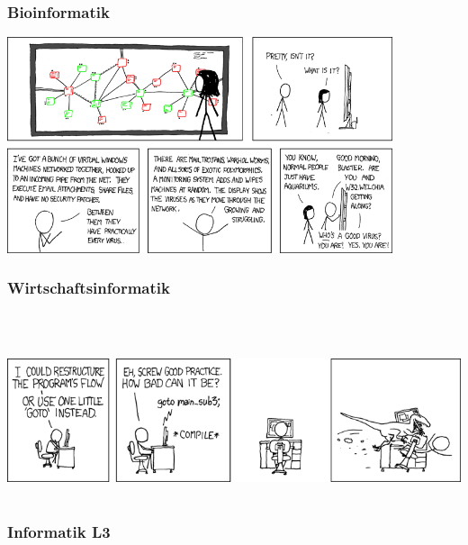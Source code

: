 \documentclass[12pt,a4paper]{scrartcl}
\begin{document}
	\subsubsection{Bioinformatik}
    

    \begin{center}
        \includegraphics[width=0.85\textwidth]{comics/network.png}
    \end{center}

	\subsubsection{Wirtschaftsinformatik}
    \\
    \begin{center}
        \includegraphics[height=4.5cm]{comics/goto.png}
    \end{center}
\newpage
	\subsubsection{Informatik L3}
	



\end{document}
